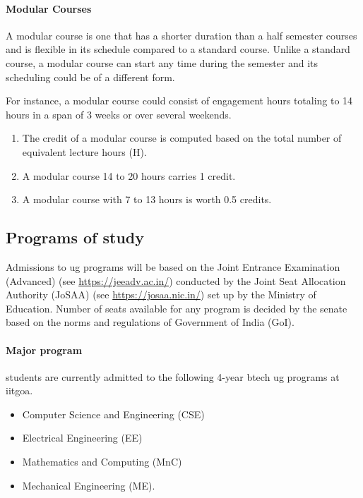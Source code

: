 \paragraph{Modular Courses} A modular course is one that has a shorter duration than a half semester courses and is flexible in its schedule compared to a standard course. Unlike a standard course, a modular course can start any time during the semester and its scheduling could be of a different form.

For instance, a modular course could consist of engagement hours totaling to 14 hours in a span of 3 weeks or over several weekends.  

\begin{enumerate}[leftmargin=15mm]
	\item The credit of a modular course is computed based on the total number of equivalent lecture hours (H).
    \item A modular course 14 to 20 hours carries 1 credit.
    \item A modular course with 7 to 13 hours is worth 0.5 credits.
\end{enumerate}

\subsection{Programs of study}

Admissions to \acrshort{ug} programs will be based on the Joint Entrance Examination (Advanced) (see \url{https://jeeadv.ac.in/}) conducted by the Joint Seat Allocation Authority (JoSAA) (see \url{https://josaa.nic.in/}) set up by the Ministry of Education. Number of seats available for any program is decided by the \gls{senate} based on the norms and regulations of Government of India (GoI).

\paragraph{Major program} \Glspl{student} are currently admitted to the following 4-year \acrfull{btech} \acrshort{ug} programs at \acrshort{iitgoa}.

\begin{itemize}[leftmargin=15mm]
	\item Computer Science and Engineering (CSE)
	\item Electrical Engineering (EE)
	\item Mathematics and Computing (MnC)
	\item Mechanical Engineering (ME).
\end{itemize}

